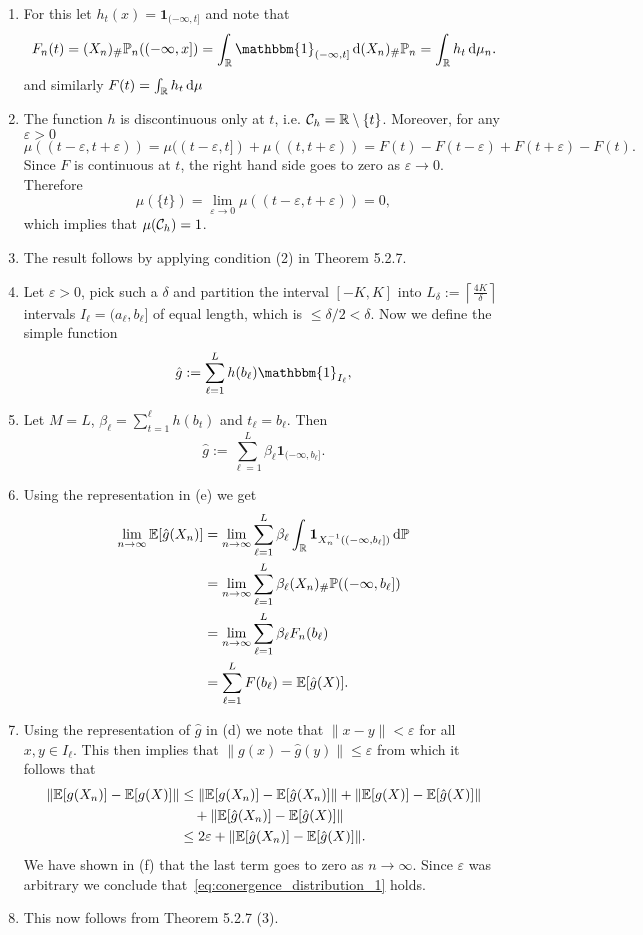 \begin{enumerate}[label={(\alph*)}]
\item For this let $h_t(x) = \mathbf{1}_{(-\infty,t]}$ and note that 
\[
	F_n(t) = (X_n)_\# \bbP_n ((-\infty,x]) = \int_\bbR \mathbbm{1}_{(-\infty,t]} \, \dd (X_n)_\# \bbP_n
	= \int_\bbR h_t \, \dd \mu_n.
\]
and similarly $F(t) = \int_{\mathbb R} h_t \, \mathrm{d} \mu$
\item The function $h$ is discontinuous only at $t$, i.e. $\mathcal C_h = \mathbb R \setminus \{t\}$. Moreover, for any $\varepsilon > 0$
\[
	\mu((t-\varepsilon, t+\varepsilon)) = \mu((t-\varepsilon,t]) + \mu((t,t+\varepsilon))
	= F(t) - F(t-\varepsilon) + F(t + \varepsilon) - F(t).
\]
Since $F$ is continuous at $t$, the right hand side goes to zero as $\varepsilon \to 0$. Therefore
\[
	\mu(\{t\}) = \lim_{\varepsilon \to 0} \mu((t-\varepsilon, t+\varepsilon)) = 0,
\]
which implies that $\mu(\mathcal C_h) = 1$.
\item The result follows by applying condition (2) in Theorem 5.2.7.
\item Let $\varepsilon > 0$, pick such a $\delta$ and partition the interval $[-K,K]$ into $L_\delta := \left \lceil \frac{4K}{\delta} \right \rceil$ intervals $I_\ell = (a_\ell, b_\ell]$ of equal length, which is $\le \delta/2 < \delta$. Now we define the simple function
\[
	\hat{g} := \sum_{\ell = 1}^L h(b_\ell) \mathbbm{1}_{I_\ell},
\]
\item Let $M=L$, $\beta_\ell = \sum_{t = 1}^\ell h(b_t)$ and $t_\ell = b_\ell$. Then
\[
	\hat{g} := \sum_{\ell = 1}^L \beta_\ell \mathbf{1}_{(-\infty, b_\ell]}.
\]
\item Using the representation in (e) we get
\begin{align*}
	\lim_{n \to \infty} \mathbb E[\hat{g}(X_n)] 
	&= \lim_{n \to \infty} \sum_{\ell = 1}^L \beta_\ell \int_{\mathbb R} \mathbf{1}_{X_n^{-1}((-\infty,b_\ell])} \, \mathrm{d} \mathbb P \\
	&= \lim_{n \to \infty} 	\sum_{\ell = 1}^L \beta_\ell (X_n)_\# \mathbb P ((-\infty, b_\ell]) \\
	&= \lim_{n \to \infty} 	\sum_{\ell = 1}^L \beta_\ell F_n(b_\ell) \\
	&= \sum_{\ell = 1}^L F(b_\ell) = \mathbb E[\hat{g}(X)].
\end{align*}
\item Using the representation of $\hat{g}$ in (d) we note that $\|x - y\| < \varepsilon$ for all $x,y \in I_\ell$. This then implies that $\|g(x) - \hat{g}(y)\| \le \varepsilon$ from which it follows that
\begin{align*}
	\|\mathbb E[g(X_n)] - \mathbb E[g(X)]\| &\le \|\mathbb E[g(X_n)] - \mathbb E[\hat{g}(X_n)]\| 
		+ \|\mathbb E[g(X)] - \mathbb E[\hat{g}(X)]\| \\
	&\hspace{10pt}+ \|\mathbb E[\hat{g}(X_n)] - \mathbb E[\hat{g}(X)]\|\\
	&\le 2\varepsilon + \|\mathbb E[\hat{g}(X_n)] - \mathbb E[\hat{g}(X)]\|.
\end{align*}
We have shown in (f) that the last term goes to zero as $n \to \infty$. Since $\varepsilon$ was arbitrary we conclude that~\eqref{eq:conergence_distribution_1} holds.
\item This now follows from Theorem 5.2.7 (3).
\end{enumerate}

